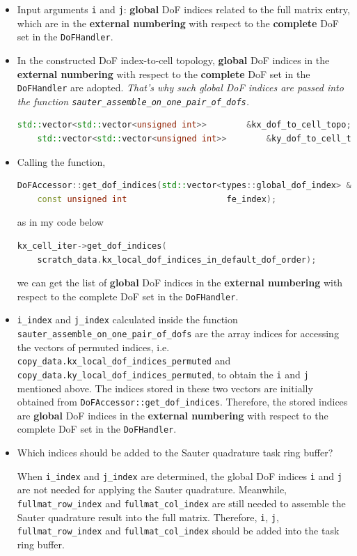 \documentclass[11pt, a4paper]{article}
\begin{document}
\begin{itemize}
\item Input arguments \texttt{i} and \texttt{j}: \textbf{global} DoF indices related to
  the full matrix entry, which are in the \textbf{external numbering} with respect to the
  \textbf{complete} DoF set in the \texttt{DoFHandler}.
\item In the constructed DoF index-to-cell topology, \textbf{global} DoF indices in the
  \textbf{external numbering} with respect to the \textbf{complete} DoF set in the
  \texttt{DoFHandler} are adopted. \emph{That's why such global DoF indices are passed
    into the function \texttt{sauter\_assemble\_on\_one\_pair\_of\_dofs}.}
  \begin{lstlisting}[language=C++]
    std::vector<std::vector<unsigned int>>        &kx_dof_to_cell_topo;
    std::vector<std::vector<unsigned int>>        &ky_dof_to_cell_topo;
  \end{lstlisting}
\item Calling the function,
  \begin{lstlisting}[language=C++]
    DoFAccessor::get_dof_indices(std::vector<types::global_dof_index> &dof_indices,
    const unsigned int                    fe_index);
  \end{lstlisting}
  as in my code below
  \begin{lstlisting}[language=C++]
    kx_cell_iter->get_dof_indices(
    scratch_data.kx_local_dof_indices_in_default_dof_order);
  \end{lstlisting}
  we can get the list of \textbf{global} DoF indices in the \textbf{external numbering}
  with respect to the complete DoF set in the \texttt{DoFHandler}.
\item \texttt{i\_index} and \texttt{j\_index} calculated inside the function
  \texttt{sauter\_assemble\_on\_one\_pair\_of\_dofs} are the array indices for accessing
  the vectors of permuted indices, i.e.
  \texttt{copy\_data.kx\_local\_dof\_indices\_permuted} and
  \texttt{copy\_data.ky\_local\_dof\_indices\_permuted}, to obtain the \texttt{i} and
  \texttt{j} mentioned above. The indices stored in these two vectors are initially
  obtained from \texttt{DoFAccessor::get\_dof\_indices}. Therefore, the stored indices are
  \textbf{global} DoF indices in the \textbf{external numbering} with respect to the
  complete DoF set in the \texttt{DoFHandler}.
\item Which indices should be added to the Sauter quadrature task ring buffer?

  When \texttt{i\_index} and \texttt{j\_index} are determined, the global DoF indices
  \texttt{i} and \texttt{j} are not needed for applying the Sauter quadrature. Meanwhile,
  \texttt{fullmat\_row\_index} and \texttt{fullmat\_col\_index} are still needed to
  assemble the Sauter quadrature result into the full matrix. Therefore, \texttt{i},
  \texttt{j}, \texttt{fullmat\_row\_index} and \texttt{fullmat\_col\_index} should be
  added into the task ring buffer.
\end{itemize}
\end{document}
